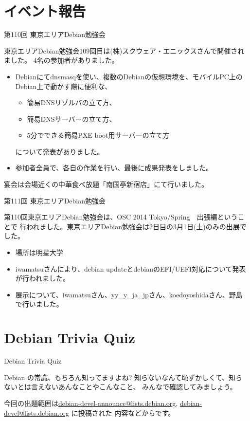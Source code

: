 \section{イベント報告}

\begin{frame}{第110回 東京エリアDebian勉強会}

 東京エリアDebian勉強会109回目は(株)スクウェア・エニックスさんで開催されました。
4名の参加者がありました。

\begin{itemize}
\item Debianにてdnsmasqを使い、複数のDebianの仮想環境を、モバイルPC上のDebian上で動かす際に便利な、
  \begin{itemize}
    \item 簡易DNSリゾルバの立て方、
    \item 簡易DNSサーバーの立て方、
    \item 5分でできる簡易PXE boot用サーバーの立て方
　\end{itemize}
について発表がありました。
\item 参加者全員で、各自の作業を行い、最後に成果発表をしました。
\end{itemize}

 宴会は会場近くの中華食べ放題「南国亭新宿店」にて行いました。

\end{frame}

\begin{frame}{第111回 東京エリアDebian勉強会}

 第110回東京エリアDebian勉強会は、OSC 2014 Tokyo/Spring　出張編ということで
行われました。東京エリアDebian勉強会は2日目の3月1日(土)のみの出展でした。

\begin{itemize}
\item 場所は明星大学
\item iwamatsuさんにより、debian updateとdebianのEFI/UEFI対応について発表が行われました。
\item 展示について、iwamatsuさん、yy\_y\_ja\_jpさん、koedoyoshidaさん、野島で行いました。
\end{itemize}

\end{frame}

\section{Debian Trivia Quiz}
\begin{frame}{Debian Trivia Quiz}

  Debian の常識、もちろん知ってますよね?
知らないなんて恥ずかしくて、知らないとは言えないあんなことやこんなこと、
みんなで確認してみましょう。

今回の出題範囲は\url{debian-devel-announce@lists.debian.org},
\url{debian-devel@lists.debian.org} に投稿された
内容などからです。

\end{frame}

